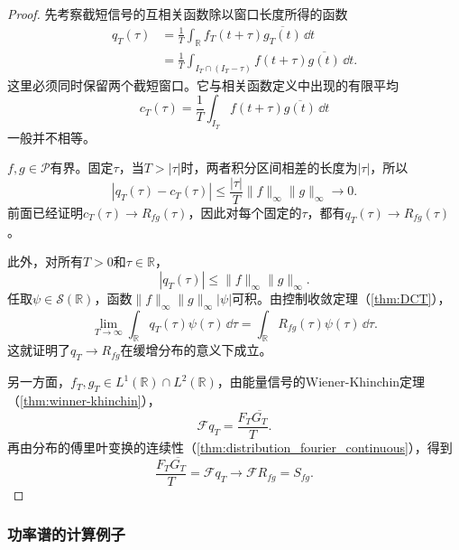 \begin{proof}
    先考察截短信号的互相关函数除以窗口长度所得的函数
    \begin{align}
        q_T(\tau)
         & =\frac{1}{T}\int_{\mathbb{R}}f_T(t+\tau)\overline{g_T(t)}\,\dd t\nonumber    \\
         & =\frac{1}{T}\int_{I_T\cap(I_T-\tau)}f(t+\tau)\overline{g(t)}\,\dd t.
    \end{align}
    这里必须同时保留两个截短窗口。它与相关函数定义中出现的有限平均
    \begin{equation}
        c_T(\tau)=\frac{1}{T}\int_{I_T}f(t+\tau)\overline{g(t)}\,\dd t
    \end{equation}
    一般并不相等。

    $f,g\in\mathcal{P}$有界。固定$\tau$，当$T>|\tau|$时，两者积分区间相差的长度为$|\tau|$，所以
    \begin{equation}
        |q_T(\tau)-c_T(\tau)|\le\frac{|\tau|}{T}\|f\|_\infty\|g\|_\infty\longrightarrow 0.
    \end{equation}
    前面已经证明$c_T(\tau)\to R_{fg}(\tau)$，因此对每个固定的$\tau$，都有$q_T(\tau)\to R_{fg}(\tau)$。

    此外，对所有$T>0$和$\tau\in\mathbb{R}$，
    \begin{equation}
        |q_T(\tau)|\le\|f\|_\infty\|g\|_\infty.
    \end{equation}
    任取$\psi\in\mathcal{S}(\mathbb{R})$，函数$\|f\|_\infty\|g\|_\infty|\psi|$可积。由控制收敛定理（\cref{thm:DCT}），
    \begin{equation}
        \lim_{T\to\infty}\int_{\mathbb{R}}q_T(\tau)\psi(\tau)\,\dd\tau=\int_{\mathbb{R}}R_{fg}(\tau)\psi(\tau)\,\dd\tau.
    \end{equation}
    这就证明了$q_T\to R_{fg}$在缓增分布的意义下成立。

    另一方面，$f_T,g_T\in L^1(\mathbb{R})\cap L^2(\mathbb{R})$，由能量信号的Wiener-Khinchin定理（\cref{thm:winner-khinchin}），
    \begin{equation}
        \mathcal{F}q_T=\frac{F_T\overline{G_T}}{T}.
    \end{equation}
    再由分布的傅里叶变换的连续性（\cref{thm:distribution_fourier_continuous}），得到
    \begin{equation}
        \frac{F_T\overline{G_T}}{T}=\mathcal{F}q_T\longrightarrow\mathcal{F}R_{fg}=S_{fg}.
    \end{equation}
\end{proof}

\subsubsection{功率谱的计算例子}

